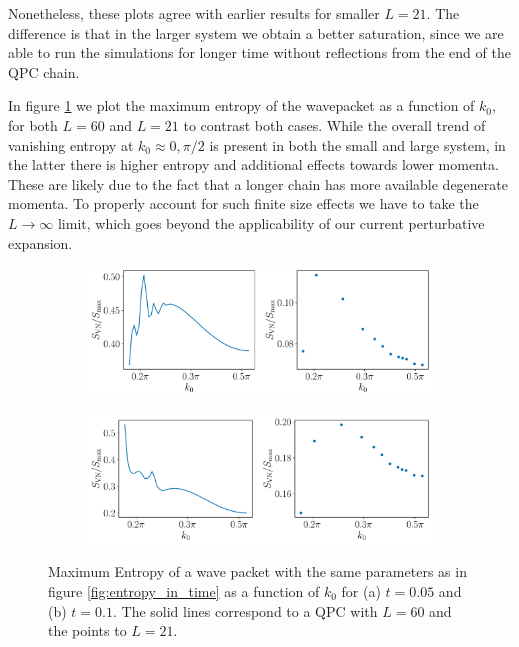 \documentclass{article}
\begin{document}
Nonetheless, these plots agree with earlier results for smaller $L=21$. The difference is that in the larger system we obtain a better saturation, since we are able to run the simulations for longer time without reflections from the end of the QPC chain.

In figure \ref{fig:wave_packet_entropy} we plot the maximum entropy of the wavepacket as a function of $k_0$, for both $L=60$ and $L=21$ to contrast both cases. While the overall trend of vanishing entropy at $k_0 \approx 0, \pi/2$ is present in both the small and large system, in the latter there is higher entropy and additional effects towards lower momenta. These are likely due to the fact that a longer chain has more available degenerate momenta. To properly account for such finite size effects we have to take the $L\rightarrow \infty$ limit, which goes beyond the applicability of our current perturbative expansion.

\begin{figure}[h]
    \centering
    \begin{subfigure}[b]{0.7\textwidth}
        \includegraphics[width=\textwidth]{figures/report_08_2025/wavepacket_entropies_Lqpc=60_Omega=0.4_t=0.05.pdf}
        \caption{}
    \end{subfigure}
    \vspace{0.001\textwidth}
    \begin{subfigure}[b]{0.7\textwidth}
        \includegraphics[width=\textwidth]{figures/report_08_2025/wavepacket_entropies_Lqpc=60_Omega=0.4_t=0.1.pdf}
        \caption{}
    \end{subfigure}
    \caption{Maximum Entropy of a wave packet with the same parameters as in figure \ref{fig:entropy_in_time} as a function of $k_0$ for (a) $t=0.05$ and (b) $t=0.1$. The solid lines correspond to a QPC with $L=60$ and the points to $L=21$.}
    \label{fig:wave_packet_entropy}
\end{figure}
\end{document}
